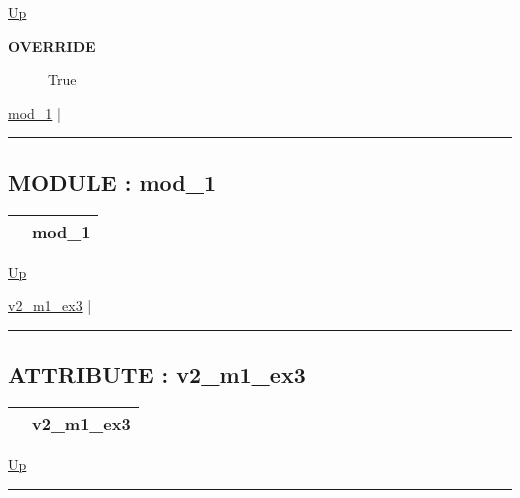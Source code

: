 \hyperlink{ecldoc:example_11}{Up}

\par

\par
\begin{description}
\item [\textbf{OVERRIDE}] True
\end{description}

\hyperlink{ecldoc:Inintest.Example_3.mod_1}{mod\_1}  |

\rule{\textwidth}{0.4pt}

\subsection*{MODULE : mod\_1}
\hypertarget{ecldoc:Inintest.Example_3.mod_1}{}

{\renewcommand{\arraystretch}{1.5}
\begin{tabularx}{\textwidth}{|>{\raggedright\arraybackslash}l|X|}
\hline
\hspace{0pt} & mod\_1 \\
\hline
\end{tabularx}
}

\hyperlink{ecldoc:Inintest.Example_3}{Up}

\par


\hyperlink{ecldoc:inintest.example_3.mod_1.v2_m1_ex3}{v2\_m1\_ex3}  |

\rule{\textwidth}{0.4pt}

\subsection*{ATTRIBUTE : v2\_m1\_ex3}
\hypertarget{ecldoc:inintest.example_3.mod_1.v2_m1_ex3}{}

{\renewcommand{\arraystretch}{1.5}
\begin{tabularx}{\textwidth}{|>{\raggedright\arraybackslash}l|X|}
\hline
\hspace{0pt} & v2\_m1\_ex3 \\
\hline
\end{tabularx}
}

\hyperlink{ecldoc:Inintest.Example_3.mod_1}{Up}

\par


\rule{\textwidth}{0.4pt}






